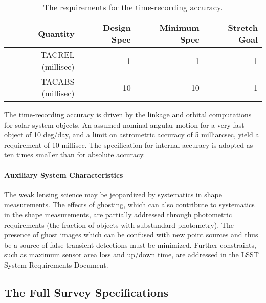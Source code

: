 \begin{table}[h]
\begin{tabular}{|r|r|r|r|}
\hline
Quantity             & Design Spec & Minimum Spec & Stretch Goal     \\
\hline
 TACREL (millisec)   &     1  &    1   &    1 \\
 TACABS (millisec)   &    10  &   10   &    1 \\
\hline
\end{tabular}
\caption{The requirements for the time-recording accuracy.}
\label{TtimeRec}
\end{table}

The time-recording accuracy is driven by the linkage and
orbital computations for solar system objects. An assumed
nominal angular motion for a very fast object of 10 deg/day,
and a limit on astrometric accuracy of 5 milliarcsec, yield
a requirement of 10 millisec. The specification for internal
accuracy is adopted as ten times smaller than for absolute
accuracy.




\paragraph{Auxiliary System Characteristics\\}

The weak lensing science may be jeopardized by systematics in shape
measurements.
The effects of ghosting, which can also contribute to systematics in the
shape measurements, are partially addressed through photometric
requirements (\eg the fraction of objects with substandard photometry).
The presence of ghost images which can be confused with new point sources
and thus be a source of false transient detections must be minimized.
Further constraints, such as maximum sensor area loss and up/down time,
are addressed in the LSST System Requirements Document.

\subsection{          The Full Survey Specifications                   }


